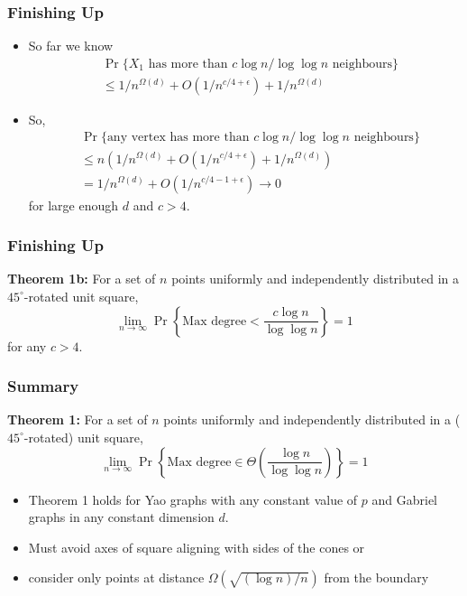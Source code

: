\documentclass{beamer}
\begin{document}
\frame
{
  \frametitle{Finishing Up}

   \begin{itemize}
     \item So far we know
       \[
         \begin{aligned}
          &\Pr\{\mbox{$X_1$ has more than $c\log n/\log\log n$ neighbours}\} \\
          & \le 1/n^{\Omega(d)} + O(1/n^{c/4+\epsilon}) + 1/n^{\Omega(d)}  
         \end{aligned}
       \]
     \item So,
       \[
         \begin{aligned}
          &\Pr\{\mbox{any vertex has more than $c\log n/\log\log n$ neighbours}\} \\
          & \le n(1/n^{\Omega(d)} + O(1/n^{c/4+\epsilon}) + 1/n^{\Omega(d)}) \\
          & = 1/n^{\Omega(d)} + O(1/n^{c/4-1+\epsilon}) \rightarrow 0
         \end{aligned}
       \]
      for large enough $d$ and $c>4$.
   \end{itemize}
}

\frame
{
  \frametitle{Finishing Up}


       \textbf{Theorem 1b:}
           For a set of $n$ points uniformly and independently distributed
		in a $45^\circ$-rotated unit square, 
           \[\lim_{n\rightarrow\infty}
              \Pr\left\{\mbox{Max degree} < \frac{c\log
n}{\log\log n}\right\} = 1 \]
           for any $c > 4$.

}

\frame
{
  \frametitle{Summary}

    \textbf{Theorem 1:}
     For a set of $n$ points uniformly and independently distributed
		in a ($45^\circ$-rotated) unit square, 
     \[\lim_{n\rightarrow\infty}
         \Pr\left\{\mbox{Max degree} 
           \in \Theta\left(\frac{\log n}{\log\log n}\right)\right\} = 1 
     \]

    \begin{itemize}
      \item Theorem 1 holds for Yao graphs with any constant value of $p$
         and Gabriel graphs in any constant dimension $d$.
      \item Must avoid axes of square aligning with
	sides of the cones or 
      \item consider only points at distance
         $\Omega(\sqrt{(\log n)/n})$ from the boundary
    \end{itemize}


}


\end{document}
